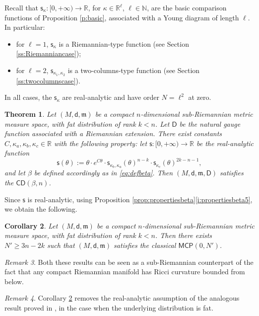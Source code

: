 \documentclass[11pt,a4paper]{article}
\theoremstyle{plain}
\newtheorem{theorem}{Theorem}[section]
\newtheorem{corollary}[theorem]{Corollary}
\theoremstyle{definition}
\theoremstyle{remark}
\newtheorem{remark}[theorem]{Remark}
\numberwithin{equation}{section}
\newcommand{\R}{\mathbb{R}} %
\newcommand{\N}{\mathbb{N}} %
\newcommand{\CD}{\mathsf{CD}}
\newcommand{\MCP}{\mathsf{MCP}}
\newcommand{\sfs}{\mathsf{s}}
\newcommand{\mm}{\mathfrak m}
\newcommand{\sfd}{\mathsf d}
\newcommand{\sfD}{\mathsf D}
\begin{document}
Recall that $\sfs_\kappa:[0,+\infty)\to \R$, for $\kappa\in\R^\ell$, $\ell\in \N$, are the basic comparison functions of Proposition \ref{p:basic}, associated with a Young diagram of length $\ell$. In particular:
\begin{itemize}
\item for $\ell=1$, $\sfs_{\kappa}$ is a Riemannian-type function (see Section \ref{ss:Riemanniancase});
\item for $\ell=2$, $\sfs_{\kappa_1,\kappa_2}$ is a two-columns-type function (see Section \ref{ss:twocolumnscase}).
\end{itemize}
In all cases, the $\sfs_\kappa$ are real-analytic and have order $N=\ell^2$ at zero.


\begin{theorem}\label{thm:fatcptareCD}
Let $(M,\sfd,\mm)$ be a compact $n$-dimensional sub-Riemannian metric measure space, with fat distribution of rank $k<n$. Let $\sfD$ be the natural gauge function associated with a Riemannian extension. There exist constants $C,\kappa_a,\kappa_b,\kappa_c\in \R$ with the following property: let $\sfs : [0,+\infty) \to \R$ be the real-analytic function
\begin{equation}
\sfs(\theta) := \theta \cdot e^{C\theta} \cdot \sfs_{\kappa_b,\kappa_a}(\theta)^{n-k} \cdot\sfs_{\kappa_c}(\theta)^{2k-n-1} ,
\end{equation}
and let $\beta$ be defined accordingly as in \eqref{eq:defbeta}. Then $(M,\sfd,\mm,\sfD)$ satisfies the $\CD(\beta,n)$.
\end{theorem}
Since $\sfs$ is real-analytic, using Proposition \ref{prop:propertiesbeta}\ref{i:propertiesbeta5}, we obtain the following.
\begin{corollary}\label{cor:fatcptareMCP}
Let $(M,\sfd,\mm)$ be a compact $n$-dimensional sub-Riemannian metric measure space, with fat distribution of rank $k<n$. Then there exists $N'\geq 3n-2k$ such that $(M,\sfd,\mm)$ satisfies the classical $\MCP(0,N')$.
\end{corollary}
\begin{remark}
Both these results can be seen as a sub-Riemannian  counterpart of the fact that any compact Riemannian manifold has Ricci curvature bounded from below.
\end{remark}
\begin{remark}
Corollary \ref{cor:fatcptareMCP} removes the real-analytic assumption of the analogous result proved in  \cite[Thm.\@ 1.3]{BR-realanalMCP}, in the case when the underlying distribution is fat.
\end{remark}
\end{document}
